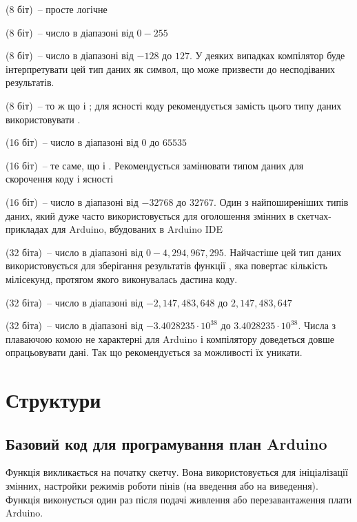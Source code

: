 \documentclass[12pt,a4paper]{book}  %
\begin{document}
     (8 біт)~-- просте логічне 
    
     (8 біт)~--  число в діапазоні від $0-255$
    
     (8 біт)~--  число в діапазоні від $-128$ до $127$. У деяких випадках компілятор буде інтерпретувати цей тип даних як символ, що може призвести до несподіваних результатів.
    
     (8 біт)~-- то ж що і ; для ясності коду рекомендується замість цього типу даних використовувати .
    
     (16 біт)~--  число в діапазоні від $0$ до $65535$
    
     (16 біт)~-- те саме, що і . Рекомендується замінювати типом даних  для скорочення коду і ясності
    
     (16 біт)~-- число в діапазоні від $-32768$ до $32767$. Один з найпоширеніших типів даних, який дуже часто використовується для оголошення змінних в скетчах-прикладах для Arduino, вбудованих в Arduino IDE
    
     (32 біта)~--  число в діапазоні від $0-4,294,967,295$. Найчастіше цей тип даних використовується для зберігання результатів функції , яка повертає кількість мілісекунд, протягом якого виконувалась дастина коду.
    
     (32 біта)~--  число в діапазоні від $-2,147,483,648$ до $2,147,483,647$
    
     (32 біта)~--  число в діапазоні від $-3.4028235\cdot 10^{38}$ до $3.4028235\cdot 10^{38}$. Числа з плаваючою комою не характерні для Arduino і компілятору доведеться довше опрацьовувати дані. Так що рекомендується за можливості їх уникати.


\section{Структури}

\subsection{Базовий код для програмування план Arduino}
Функція   викликається на початку скетчу. Вона використовується для ініціалізації змінних, настройки режимів роботи пінів (на введення або на виведення). Функція  виконується один раз після подачі живлення або перезавантаження плати Arduino.
\end{document}
